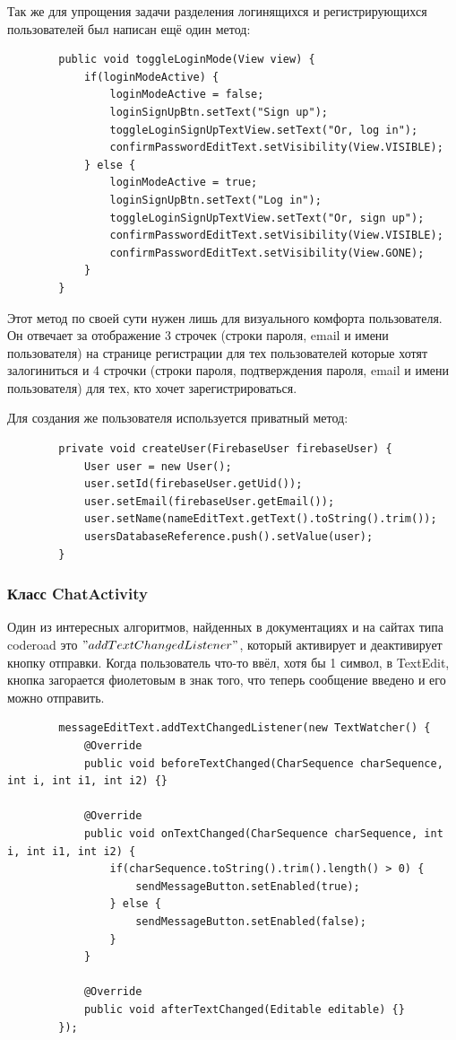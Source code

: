 \documentclass[utf8,14pt,a4paper,oneside,russian]{book}
\begin{document}
	Так же для упрощения задачи разделения логинящихся и регистрирующихся пользователей был написан ещё один метод:
	
	\begin{lstlisting}
		public void toggleLoginMode(View view) {
			if(loginModeActive) {
				loginModeActive = false;
				loginSignUpBtn.setText("Sign up");
				toggleLoginSignUpTextView.setText("Or, log in");
				confirmPasswordEditText.setVisibility(View.VISIBLE);
			} else {
				loginModeActive = true;
				loginSignUpBtn.setText("Log in");
				toggleLoginSignUpTextView.setText("Or, sign up");
				confirmPasswordEditText.setVisibility(View.VISIBLE);
				confirmPasswordEditText.setVisibility(View.GONE);
			}
		}
	\end{lstlisting}
	
	Этот метод по своей сути нужен лишь для визуального комфорта пользователя. Он отвечает за отображение 3 строчек (строки пароля, email и имени пользователя) на странице регистрации для тех пользователей которые хотят залогиниться и 4 строчки (строки пароля, подтверждения пароля, email и имени пользователя) для тех, кто хочет зарегистрироваться.
	
	Для создания же пользователя используется приватный метод:
	
	\begin{lstlisting}
		private void createUser(FirebaseUser firebaseUser) {
			User user = new User();
			user.setId(firebaseUser.getUid());
			user.setEmail(firebaseUser.getEmail());
			user.setName(nameEditText.getText().toString().trim());
			usersDatabaseReference.push().setValue(user);
		}
	\end{lstlisting}
	
	\subsubsection{Класс ChatActivity}
	
	Один из интересных алгоритмов, найденных в документациях и на сайтах типа coderoad это $"addTextChangedListener"$, который активирует и деактивирует кнопку отправки. Когда пользователь что-то ввёл, хотя бы 1 символ, в TextEdit, кнопка загорается фиолетовым в знак того, что теперь сообщение введено и его можно отправить.
	
	\begin{lstlisting}
		messageEditText.addTextChangedListener(new TextWatcher() {
			@Override
			public void beforeTextChanged(CharSequence charSequence, int i, int i1, int i2) {}
			
			@Override
			public void onTextChanged(CharSequence charSequence, int i, int i1, int i2) {
				if(charSequence.toString().trim().length() > 0) {
					sendMessageButton.setEnabled(true);
				} else {
					sendMessageButton.setEnabled(false);
				}
			}
			
			@Override
			public void afterTextChanged(Editable editable) {}
		});
	\end{lstlisting}
\end{document}
